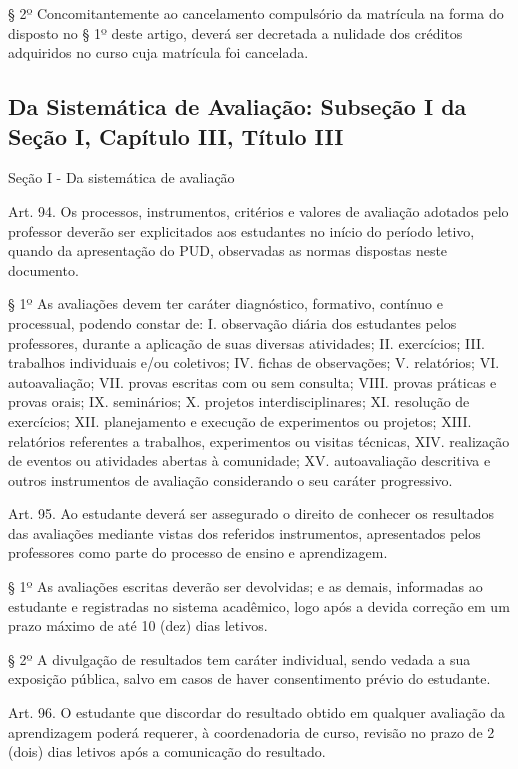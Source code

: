 \documentclass{paper}
\begin{document}
§ 2º Concomitantemente ao cancelamento compulsório da matrícula na forma do disposto no § 1º deste artigo, deverá ser decretada a nulidade dos créditos adquiridos no curso cuja matrícula foi cancelada.

\subsection{Da Sistemática de Avaliação: Subseção I da Seção I, Capítulo III, Título III}
\label{anexoRODavaliacao}

\begin{center}
Seção I - Da sistemática de avaliação
\end{center}

Art. 94. Os processos, instrumentos, critérios e valores de avaliação adotados pelo professor deverão ser explicitados aos estudantes no início do período letivo, quando da apresentação do PUD, observadas as normas dispostas neste documento.

§ 1º As avaliações devem ter caráter diagnóstico, formativo, contínuo e processual, podendo constar de:
I. observação diária dos estudantes pelos professores, durante a aplicação de suas diversas atividades;
II. exercícios;
III. trabalhos individuais e/ou coletivos;
IV. fichas de observações;
V. relatórios;
VI. autoavaliação;
VII. provas escritas com ou sem consulta;
VIII. provas práticas e provas orais;
IX. seminários;
X. projetos interdisciplinares;
XI. resolução de exercícios;
XII. planejamento e execução de experimentos ou projetos;
XIII. relatórios referentes a trabalhos, experimentos ou visitas técnicas,
XIV. realização de eventos ou atividades abertas à comunidade;
XV. autoavaliação descritiva e outros instrumentos de avaliação considerando o seu caráter progressivo.

Art. 95. Ao estudante deverá ser assegurado o direito de conhecer os resultados das avaliações mediante vistas dos referidos instrumentos, apresentados pelos professores como parte do processo de ensino e aprendizagem.

§ 1º As avaliações escritas deverão ser devolvidas; e as demais, informadas ao estudante e registradas no sistema acadêmico, logo após a devida correção em um prazo máximo de até 10 (dez) dias letivos.

§ 2º A divulgação de resultados tem caráter individual, sendo vedada a sua exposição pública, salvo em casos de haver consentimento prévio do estudante.

Art. 96. O estudante que discordar do resultado obtido em qualquer avaliação da aprendizagem poderá requerer, à coordenadoria de curso, revisão no prazo de 2 (dois) dias letivos após a comunicação do resultado.
\end{document}
